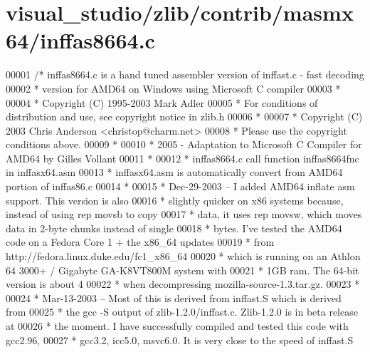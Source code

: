 \hypertarget{visual__studio_2zlib_2contrib_2masmx64_2inffas8664_8c_source}{}\section{visual\+\_\+studio/zlib/contrib/masmx64/inffas8664.c}
\label{visual__studio_2zlib_2contrib_2masmx64_2inffas8664_8c_source}

\begin{DoxyCode}
00001 \textcolor{comment}{/* inffas8664.c is a hand tuned assembler version of inffast.c - fast decoding}
00002 \textcolor{comment}{ * version for AMD64 on Windows using Microsoft C compiler}
00003 \textcolor{comment}{ *}
00004 \textcolor{comment}{ * Copyright (C) 1995-2003 Mark Adler}
00005 \textcolor{comment}{ * For conditions of distribution and use, see copyright notice in zlib.h}
00006 \textcolor{comment}{ *}
00007 \textcolor{comment}{ * Copyright (C) 2003 Chris Anderson <christop@charm.net>}
00008 \textcolor{comment}{ * Please use the copyright conditions above.}
00009 \textcolor{comment}{ *}
00010 \textcolor{comment}{ * 2005 - Adaptation to Microsoft C Compiler for AMD64 by Gilles Vollant}
00011 \textcolor{comment}{ *}
00012 \textcolor{comment}{ * inffas8664.c call function inffas8664fnc in inffasx64.asm}
00013 \textcolor{comment}{ *  inffasx64.asm is automatically convert from AMD64 portion of inffas86.c}
00014 \textcolor{comment}{ *}
00015 \textcolor{comment}{ * Dec-29-2003 -- I added AMD64 inflate asm support.  This version is also}
00016 \textcolor{comment}{ * slightly quicker on x86 systems because, instead of using rep movsb to copy}
00017 \textcolor{comment}{ * data, it uses rep movsw, which moves data in 2-byte chunks instead of single}
00018 \textcolor{comment}{ * bytes.  I've tested the AMD64 code on a Fedora Core 1 + the x86\_64 updates}
00019 \textcolor{comment}{ * from http://fedora.linux.duke.edu/fc1\_x86\_64}
00020 \textcolor{comment}{ * which is running on an Athlon 64 3000+ / Gigabyte GA-K8VT800M system with}
00021 \textcolor{comment}{ * 1GB ram.  The 64-bit version is about 4%
00022 \textcolor{comment}{ * when decompressing mozilla-source-1.3.tar.gz.}
00023 \textcolor{comment}{ *}
00024 \textcolor{comment}{ * Mar-13-2003 -- Most of this is derived from inffast.S which is derived from}
00025 \textcolor{comment}{ * the gcc -S output of zlib-1.2.0/inffast.c.  Zlib-1.2.0 is in beta release at}
00026 \textcolor{comment}{ * the moment.  I have successfully compiled and tested this code with gcc2.96,}
00027 \textcolor{comment}{ * gcc3.2, icc5.0, msvc6.0.  It is very close to the speed of inffast.S}
}
\end{DoxyCode}
